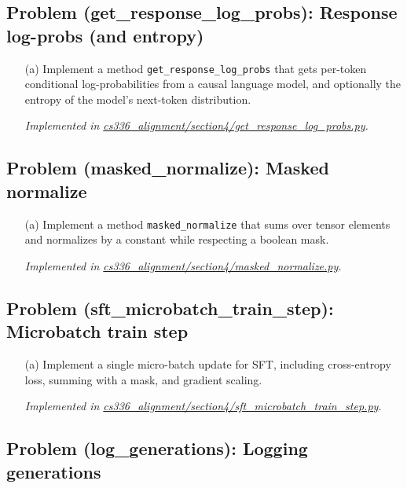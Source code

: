\documentclass[letterpaper]{article}
\newcommand{\repofile}[2]{\href{https://github.com/echung32/ece405-assignment3-alignment/blob/main/#1}{#2}}
\begin{document}
	\subsection{Problem (get\_response\_log\_probs): Response log-probs (and entropy)}
	
	\begin{itemize}
		\item[(a)] Implement a method \texttt{get\_response\_log\_probs} that gets per-token conditional log-probabilities from a causal language model, and optionally the entropy of the model’s next-token distribution.
		
		\textit{Implemented in \repofile{cs336_alignment/section4/get_response_log_probs.py}{cs336\_alignment/section4/get\_response\_log\_probs.py}.}
		
	\end{itemize}
	
	\subsection{Problem (masked\_normalize): Masked normalize}
	
	\begin{itemize}
		\item[(a)] Implement a method \texttt{masked\_normalize} that sums over tensor elements and normalizes by a constant while respecting a boolean mask.
		
		\textit{Implemented in \repofile{cs336_alignment/section4/masked_normalize.py}{cs336\_alignment/section4/masked\_normalize.py}.}
		
	\end{itemize}
	
	\subsection{Problem (sft\_microbatch\_train\_step): Microbatch train step}
	
	\begin{itemize}
		\item[(a)] Implement a single micro-batch update for SFT, including cross-entropy loss, summing with a mask, and gradient scaling.
		
		\textit{Implemented in \repofile{cs336_alignment/section4/sft_microbatch_train_step.py}{cs336\_alignment/section4/sft\_microbatch\_train\_step.py}.}
		
	\end{itemize}
	
	\subsection{Problem (log\_generations): Logging generations}
	
\end{document}
